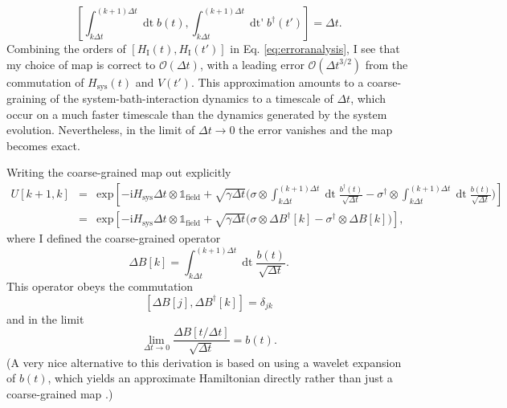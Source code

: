 \documentclass[%
 onecolumn,
 notitlepage,
 longbibliography,
 amsmath,amssymb,
 aps,
 pra,
 10pt,
]{revtex4-1}
\begin{document}
\begin{equation}
\left[\int_{k\Delta t}^{(k+1)\Delta t}\mathop{\textrm{d}t} b(t),\int_{k\Delta t}^{(k+1)\Delta t}\mathop{\textrm{d}t'} b^\dagger(t')\right]=\Delta t.
\end{equation}
Combining the orders of $\left[H_\textrm{I}(t),H_\textrm{I}(t')\right]$ in Eq. \ref{eq:erroranalysis}, I see that my choice of map is correct to $\mathcal{O}(\Delta t)$, with a leading error $\mathcal{O}(\Delta t^{3/2})$ from the commutation of $H_\textrm{sys}(t)$ and $V(t')$. This approximation amounts to a coarse-graining of the system-bath-interaction dynamics to a timescale of $\Delta t$, which occur on a much faster timescale than the dynamics generated by the system evolution. Nevertheless, in the limit of $\Delta t\rightarrow 0$ the error vanishes and the map becomes exact.

Writing the coarse-grained map out explicitly
\begin{eqnarray}
U[k+1,k]&=&\textrm{exp}\left[-\textrm{i}H_\text{sys}\Delta t\otimes\mathbb{1}_\text{field}+\sqrt{\gamma\Delta t}\Big(\sigma \otimes\int_{k\Delta t}^{(k+1)\Delta t} \mathop{\textrm{d}t} \frac{b^\dagger(t)}{\sqrt{\Delta t}} - \sigma^\dagger \otimes\int_{k\Delta t}^{(k+1)\Delta t} \mathop{\textrm{d}t}\frac{b(t)}{\sqrt{\Delta t}}\Big)\right]\\
&=&\textrm{exp}\left[-\textrm{i}H_\text{sys}\Delta t\otimes\mathbb{1}_\text{field}+\sqrt{\gamma\Delta t}\Big(\sigma \otimes\Delta B^\dagger[k] - \sigma^\dagger\otimes\Delta B[k] \Big)\right],
\end{eqnarray}
where I defined the coarse-grained operator
\begin{equation}
\Delta B[k]=\int_{k\Delta t}^{(k+1)\Delta t}\mathop{\textrm{d}t} \frac{b(t)}{\sqrt{\Delta t}}.
\end{equation}
This operator obeys the commutation
\begin{equation}
\left[\Delta B[j],\Delta B^\dagger[k]\right]=\delta_{jk}\label{eq:commute}
\end{equation}
and in the limit
\begin{equation}
\lim_{\Delta t\rightarrow 0}\frac{\Delta B[t/\Delta t]}{\sqrt{\Delta t}} = b(t).
\end{equation}
(A very nice alternative to this derivation is based on using a wavelet expansion of $b(t)$, which yields an approximate Hamiltonian directly rather than just a coarse-grained map \cite{gross2017qubit}.)
\end{document}
